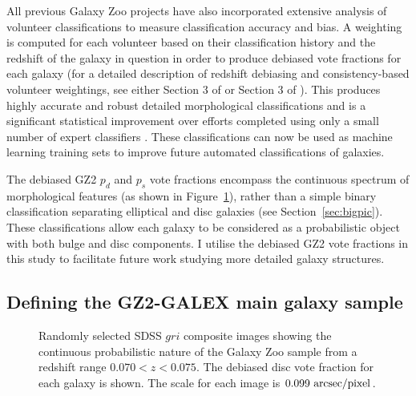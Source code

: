 All previous Galaxy Zoo projects have also incorporated extensive analysis of volunteer classifications to measure classification accuracy and bias. A weighting is computed for each volunteer based on their classification history and the redshift of the galaxy in question in order to produce debiased vote fractions for each galaxy (for a detailed description of redshift debiasing and consistency-based volunteer weightings, see either Section 3 of \citealt{Lintott09} or Section 3 of \citealt{GZ2}). This produces highly accurate and robust detailed morphological classifications and is a significant statistical improvement over efforts completed using only a small number of expert classifiers \citep{schawinski07, nair10b, ann15}. These classifications can now be used as machine learning training sets \citep{dieleman15} to improve future automated classifications of galaxies. 

The debiased GZ2 $p_d$ and $p_s$ vote fractions encompass the continuous spectrum of morphological features (as shown in Figure~\ref{fig:mosaic}), rather than a simple binary classification separating elliptical and disc galaxies (see Section~\ref{sec:bigpic}). These classifications allow each galaxy to be considered as a probabilistic object with both bulge and disc components. I utilise the debiased GZ2 vote fractions in this study to facilitate future work studying more detailed galaxy structures. 

\subsection{Defining the GZ2-GALEX main galaxy sample}\label{sec:defsample}

\begin{figure}
\caption[Example SDSS images with GZ2 vote fractions]{Randomly selected SDSS $gri$ composite images showing the continuous probabilistic nature of the Galaxy Zoo sample from a redshift range $0.070 < z < 0.075$. The debiased disc vote fraction for each galaxy is shown. The scale for each image is $0.099~\rm{arcsec/pixel}$.}
\label{fig:mosaic}
\end{figure}

